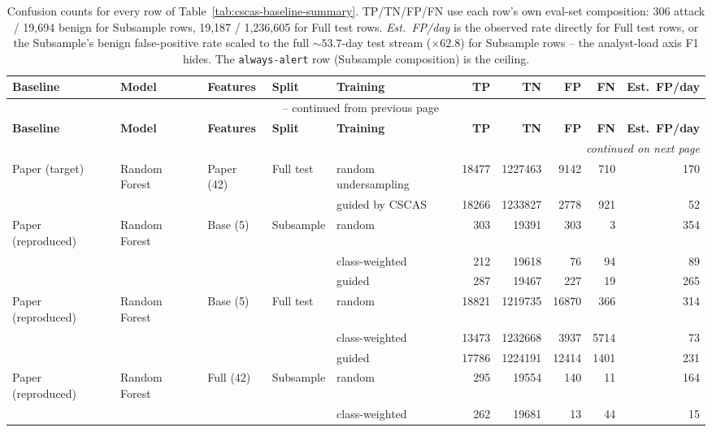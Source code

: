 \begin{longtable}{lllllrrrrr}
\caption{Confusion counts for every row of Table~\ref{tab:cscas-baseline-summary}.
TP/TN/FP/FN use each row's own eval-set composition: 306 attack /
19{,}694 benign for Subsample rows, 19{,}187 / 1{,}236{,}605 for Full test
rows. \emph{Est.\ FP/day} is the observed rate directly for Full test rows,
or the Subsample's benign false-positive rate scaled to the full
${\sim}53.7$-day test stream (${\times}62.8$) for Subsample rows -- the
analyst-load axis F1 hides. The \texttt{always-alert} row (Subsample
composition) is the ceiling.}
\label{tab:cscas-confusion-counts} \\
\toprule
\textbf{Baseline} & \textbf{Model} & \textbf{Features} & \textbf{Split} & \textbf{Training} & \textbf{TP} & \textbf{TN} & \textbf{FP} & \textbf{FN} & \textbf{Est.\ FP/day} \\
\midrule
\endfirsthead
\multicolumn{10}{c}{\tablename\ \thetable{} -- continued from previous page} \\
\toprule
\textbf{Baseline} & \textbf{Model} & \textbf{Features} & \textbf{Split} & \textbf{Training} & \textbf{TP} & \textbf{TN} & \textbf{FP} & \textbf{FN} & \textbf{Est.\ FP/day} \\
\midrule
\endhead
\midrule \multicolumn{10}{r}{\textit{continued on next page}} \\
\endfoot
\bottomrule
\endlastfoot
Paper (target) & Random Forest & Paper (42) & Full test & random undersampling & 18477 & 1227463 & 9142 & 710 & 170 \\
 &  &  &  & guided by CSCAS & 18266 & 1233827 & 2778 & 921 & 52 \\
\addlinespace
Paper (reproduced) & Random Forest & Base (5) & Subsample & random & 303 & 19391 & 303 & 3 & 354 \\
 &  &  &  & class-weighted & 212 & 19618 & 76 & 94 & 89 \\
 &  &  &  & guided & 287 & 19467 & 227 & 19 & 265 \\
\addlinespace
Paper (reproduced) & Random Forest & Base (5) & Full test & random & 18821 & 1219735 & 16870 & 366 & 314 \\
 &  &  &  & class-weighted & 13473 & 1232668 & 3937 & 5714 & 73 \\
 &  &  &  & guided & 17786 & 1224191 & 12414 & 1401 & 231 \\
\addlinespace
Paper (reproduced) & Random Forest & Full (42) & Subsample & random & 295 & 19554 & 140 & 11 & 164 \\
 &  &  &  & class-weighted & 262 & 19681 & 13 & 44 & 15 \\

\end{longtable}
